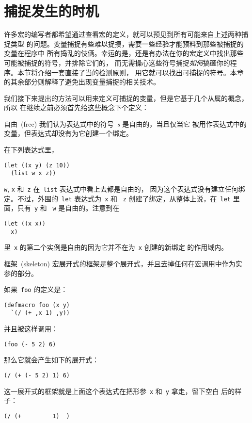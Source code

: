\section{捕捉发生的时机}
\label{sec:when_capture_occurs}

许多宏的编写者都希望通过查看宏的定义，就可以预见到所有可能来自上述两种捕捉类型
的问题。变量捕捉有些难以捉摸，需要一些经验才能预料到那些被捕捉的变量在程序中
所有捣乱的伎俩。幸运的是，还是有办法在你的宏定义中找出那些可能被捕捉的符号，并排除它们的，
而无需操心这些符号捕捉\emph{如何}搞砸你的程序。本节将介绍一套直接了当的检测原则，
用它就可以找出可捕捉的符号。本章的其余部分则解释了避免出现变量捕捉的相关技术。

我们接下来提出的方法可以用来定义可捕捉的变量，但是它基于几个从属的概念，所以
在继续之前必须首先给这些概念下个定义：

\begin{defineit}{自由~(free)}
我们认为表达式中的符号~\emph{s} 是自由的，当且仅当它
被用作表达式中的变量，但表达式却没有为它创建一个绑定。
\end{defineit}

在下列表达式里，
\begin{lstlisting}
(let ((x y) (z 10))
  (list w x z))
\end{lstlisting}
\texttt{w}, \texttt{x} 和~\texttt{z} 在~\texttt{list} 表达式中看上去都是自由的，
因为这个表达式没有建立任何绑定。不过，外围的~\texttt{let} 表达式为~\texttt{x} 和
~\texttt{z} 创建了绑定，从整体上说，在~\texttt{let} 里面，只有~\texttt{y} 和
~\texttt{w} 是自由的。注意到在
\begin{lstlisting}
(let ((x x))
  x)
\end{lstlisting}
里~\texttt{x} 的第二个实例是自由的\pozhehao{}因为它并不在为~\texttt{x} 创建的新绑定
的作用域内。

\begin{defineit}{框架~(skeleton)}
宏展开式的框架是整个展开式，并且去掉任何在宏调用中作为实参的部分。
\end{defineit}

如果~\texttt{foo} 的定义是：
\begin{lstlisting}
(defmacro foo (x y)
  `(/ (+ ,x 1) ,y))
\end{lstlisting}
并且被这样调用：
\begin{lstlisting}
(foo (- 5 2) 6)
\end{lstlisting}
那么它就会产生如下的展开式：
\begin{lstlisting}
(/ (+ (- 5 2) 1) 6)
\end{lstlisting}
这一展开式的框架就是上面这个表达式在把形参~\texttt{x} 和~\texttt{y} 拿走，留下空白
后的样子：
\begin{lstlisting}
(/ (+         1)  )
\end{lstlisting}

